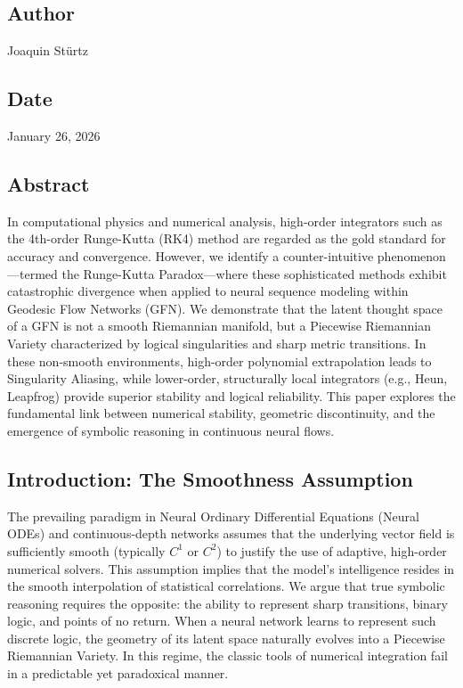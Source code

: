 \documentclass{article}
\numberwithin{equation}{section}
\begin{document}
\subsection*{Author}
Joaquin Stürtz
\subsection*{Date}
January 26, 2026
\subsection*{Abstract}
In computational physics and numerical analysis, high-order integrators such as the 4th-order Runge-Kutta (RK4) method are regarded as the gold standard for accuracy and convergence. However, we identify a counter-intuitive phenomenon—termed the Runge-Kutta Paradox—where these sophisticated methods exhibit catastrophic divergence when applied to neural sequence modeling within Geodesic Flow Networks (GFN). We demonstrate that the latent thought space of a GFN is not a smooth Riemannian manifold, but a Piecewise Riemannian Variety characterized by logical singularities and sharp metric transitions. In these non-smooth environments, high-order polynomial extrapolation leads to Singularity Aliasing, while lower-order, structurally local integrators (e.g., Heun, Leapfrog) provide superior stability and logical reliability. This paper explores the fundamental link between numerical stability, geometric discontinuity, and the emergence of symbolic reasoning in continuous neural flows.

\subsection{Introduction: The Smoothness Assumption}
The prevailing paradigm in Neural Ordinary Differential Equations (Neural ODEs) and continuous-depth networks assumes that the underlying vector field is sufficiently smooth (typically $C^1$ or $C^2$) to justify the use of adaptive, high-order numerical solvers. This assumption implies that the model's intelligence resides in the smooth interpolation of statistical correlations.
We argue that true symbolic reasoning requires the opposite: the ability to represent sharp transitions, binary logic, and points of no return. When a neural network learns to represent such discrete logic, the geometry of its latent space naturally evolves into a Piecewise Riemannian Variety. In this regime, the classic tools of numerical integration fail in a predictable yet paradoxical manner.
\end{document}
